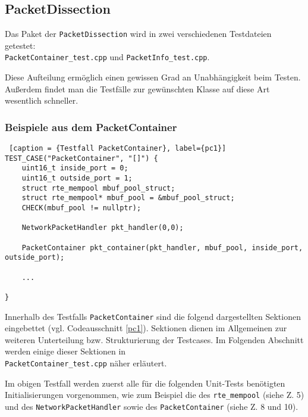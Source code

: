 \documentclass[../review_3.tex]{subfiles}
\begin{document}
\subsection{PacketDissection}
Das Paket der \texttt{PacketDissection} wird in zwei verschiedenen Testdateien getestet: \\ %
\texttt{PacketContainer\_test.cpp} und \texttt{PacketInfo\_test.cpp}.

Diese Aufteilung ermöglich einen gewissen Grad an Unabhängigkeit beim Testen. Außerdem findet man die Testfälle zur gewünschten Klasse auf diese Art wesentlich schneller.
\subsubsection{Beispiele aus dem PacketContainer}
\begin{lstlisting} [caption = {Testfall PacketContainer}, label={pc1}]
TEST_CASE("PacketContainer", "[]") { 
    uint16_t inside_port = 0;
    uint16_t outside_port = 1;
    struct rte_mempool mbuf_pool_struct;
    struct rte_mempool* mbuf_pool = &mbuf_pool_struct;
    CHECK(mbuf_pool != nullptr);
    
    NetworkPacketHandler pkt_handler(0,0);
    
    PacketContainer pkt_container(pkt_handler, mbuf_pool, inside_port, outside_port);
    
    ...
   
} \end{lstlisting}
Innerhalb des Testfalls \texttt{PacketContainer} sind die folgend dargestellten Sektionen eingebettet (vgl. Codeausschnitt \ref{pc1}). Sektionen dienen im Allgemeinen zur weiteren Unterteilung bzw. Strukturierung der Testcases. Im Folgenden Abschnitt werden einige dieser Sektionen in\\ \texttt{PacketContainer\_test.cpp} näher erläutert.

Im obigen Testfall werden zuerst alle für die folgenden Unit-Tests benötigten Initialisierungen vorgenommen, wie zum Beispiel die des \texttt{rte\_mempool} (siehe Z. 5)  und des \texttt{NetworkPacketHandler} sowie des \texttt{PacketContainer} (siehe Z. 8 und 10).
\end{document}

